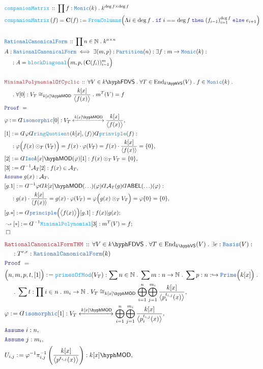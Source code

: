 \documentclass[12pt]{scrartcl}%
\newcommand{\TYPE}[1]{\textcolor{NavyBlue}{\mathtt{#1}}}%
\newcommand{\FUNC}[1]{\textcolor{Cerulean}{\mathtt{#1}}}%
\newcommand{\LOGIC}[1]{\textcolor{Blue}{\mathtt{#1}}}%
\newcommand{\THM}[1]{\textcolor{Maroon}{\mathtt{#1}}}%
\renewcommand{\.}{\; . \;} %
\newcommand{\de}{: \kern 0.1pc =} %
\newcommand{\If}{\LOGIC{if} \;} %
\newcommand{\Then}{ \; \LOGIC{then} \;} %
\newcommand{\Else}{\; \LOGIC{else} \;} %
\newcommand{\Act}[1]{\left( #1 \right)} %
\newcommand{\Theorem}[2]{& \THM{#1} \, :: \, #2 \\ & \Proof = \\ } %
\newcommand{\DeclareType}[2]{& \TYPE{#1} \, :: \, #2 \\}%
\newcommand{\DefineType}[3]{& #1 : \TYPE{#2} \iff #3 \\}%
\newcommand{\DeclareFunc}[2]{& \FUNC{#1} \, :: \, #2 \\}%
\newcommand{\DefineNamedFunc}[4]{&  \FUNC{#1}\Act{#2} = #3 \de #4 \\}%
\newcommand{\NewLine}{\\ & \kern 1pc}%
\newcommand{\Page}[1]{ \begin{align*} #1 \end{align*}  }%
\newcommand{ \bd }{ \ByDef }%
\newcommand{\Nat}{\mathbb{N}}%
\newcommand{\End}{\mathrm{End}}%
\newcommand{\ToInj}{\hookrightarrow} %
\newcommand{\Say}[3]{& #1 \de #2 : #3, \\} %
\newcommand{\Conclude}[3]{& #1 \de #2 : #3; \\}%
\newcommand{\DeriveConclude}[3]{& \leadsto #1 \de #2 : #3 ; \\} %
\newcommand{\Assume}[2]{& \LOGIC{Assume} \; #1 : #2, \\} %
\newcommand{\QED}{\; \square} %
\newcommand{\EndProof}{& \QED \\} %
\newcommand{\ByDef}{\rotatebox[origin=c]{-180}{$D$}}%
\newcommand{\Proof}{\LOGIC{Proof} \; } %
\newcommand{\ToIso}[1]{\xleftrightarrow{#1}}%
\newcommand{\A}{\mathcal{A}}
\newcommand{\ABEL}{\mathsf{ABEL}} %
\newcommand{\Basis}{\TYPE{Basis}} %
\newcommand{\RCF}{\TYPE{RationalCanonicalForm}}
\newcommand{\VS}[1]{#1\hyph\mathsf{VS}} %
\newcommand{\FDVS}[1]{#1\hyph\mathsf{FDVS}} %
\newcommand{\LMOD}[1]{#1\hyph\mathsf{MOD}} %
\begin{document}
\Page{
	\DeclareFunc{companionMatrix}{ \prod f : \TYPE{Monic}(k) \.  k^{\deg f \times \deg f}}
	\DefineNamedFunc{companionMatrix}{f}{\mathbf{C}(f)}{ \FUNC{FromColumns}\Big( \Lambda i \in \deg f \. \If i == \deg f  \Then (f_{i-1})^{\deg f}_{i=1} \Else e_{i+1} \Big)}
	\\
	\DeclareType{RationalCanonicalForm}{  \prod n \in \Nat \. k^{n \times n}}
	\DefineType{A}{RationalCanonicalForm}{\exists (m,p) : \TYPE{Partition}(n) : \exists  f : m \to \TYPE{Monic}(k) : 
		\NewLine : A = \FUNC{blockDiagonal}\Big(m,p,(\mathbf{C}(f_i))_{i=1}^{m}\Big)    }
	\\
	\Theorem{MinimalPolynomialOfCyclic}{\forall V \in \FDVS{k} \. \forall T \in \End_{\VS{k}}(V) \.  f \in \TYPE{Monic}(k) \. \NewLine \.
	    \forall [0] : V_T \cong_{\LMOD{k[x]}} \frac{k[x]}{\big\langle f(x) \big\rangle} \.  m^T(V) = f } 
	\Say{\varphi}{\bd \TYPE{isomorphic}[0]}{ V_T \ToIso{\LMOD{k[x]}} \frac{k[x]}{\big\langle f(x) \big\rangle}}
	\Say{[1]}{  \bd \varphi \bd \FUNC{ringQuotient}(k[x],\langle f \rangle) \bd \FUNC{prinviple}(f)  }
	{ 
		\NewLine : \varphi \Big( f(x) \odot_T (V_T)\Big) = f(x) \cdot \varphi(V_T)  = f(x) \cdot \frac{k[x]}{\langle f(x) \rangle} = \{0\} }
	\Say{[2]}{\bd\TYPE{Iso}{\LMOD{k[x]}}(\varphi)[1]}{f(x) \odot_T V_T = \{0\}}
	\Say{[3]}{\bd^{-1} \A_T[2]}{f(x) \in \A_T}
	\Assume{g(x)}{\A_T}
	\Say{[g.1]}{ \bd^{-1} \varphi \bd \LMOD{k[x]}(\ldots)(\varphi) \bd \A_T(g) \bd \ABEL(\ldots)(\varphi) }
	{ \NewLine : g(x) \cdot \frac{k[x]}{\langle f(x) \rangle} = g(x) \cdot \varphi(V_T) = \varphi\Big( g(x) \odot_T V_T  \Big) = \varphi\{0\} = \{0\}}
	\Conclude{[g.*]}{\bd \TYPE{principle}\Big(\big\langle f(x) \big\rangle \Big)[g.1]}{ f(x) | g(x)}
	\DeriveConclude{[*]}{\bd^{-1} \FUNC{MinimalPolynomial}[3]}{m^T(V) = f}
	\EndProof
}\Page{
	\Theorem{RationalCanonicalFormTHM}{ \forall V \in \FDVS{k} \. \forall T \in \End_{\VS{k}}(V) \. \exists e : \Basis(V) : \NewLine :T^{e,e} : \RCF(k)}
	\Say{\Big( n,m,p,t,[1] \Big)}{\FUNC{primesOfMod}(V_T)}
	{
		\sum n \in \Nat \. 
		\sum m : n \to \Nat \. 
		\sum p : n : \ToInj \TYPE{Prime}\Big(k[x]\Big) \. \NewLine \. 
		\sum t : \prod i \in n \. m_i \to \Nat \. 
		V_T \cong_{\LMOD{k[x]}} \bigoplus^n_{i=1}\bigoplus^{m_i}_{j=1} \frac{k[x]}{\big\langle p^{t_{i,j}}_{i}(x) \big\rangle} 
	}
	\Say{\varphi}{\bd \TYPE{isomorphic}[1]}{ V_T \ToIso{\LMOD{k[x]}} \bigoplus^n_{i=1}\bigoplus^{m_i}_{j=1} \frac{k[x]}{\big\langle p^{t_{i,j}}_{i}(x) \big\rangle}}
	\Assume{i}{n}
	\Assume{j}{m_i}
	\Say{U_{i,j}}{\varphi^{-1}\pi_{i,j}^{-1}\left(\frac{k[x]}{\big\langle p^{t_{i,j}}(x) \big\rangle}\right)}{\LMOD{k[x]}}
}
\end{document}
